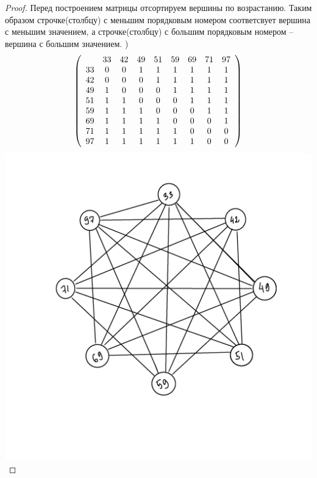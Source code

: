 \begin{proof}
Перед построением матрицы отсортируем вершины по возрастанию. Таким образом строчке(столбцу) с меньшим порядковым номером соответсвует вершина с меньшим значением, а строчке(столбцу) с большим порядковым номером -- вершина с большим значением. ) 	$$ \left( \begin{array}{c c c c c c c c c} 
   & 33 & 42 & 49 & 51 & 59 & 69 & 71 & 97 \\
 
33 & 0 & 0 & 1 & 1 & 1 & 1 & 1 & 1 \\ 

42 & 0 & 0 & 0 & 1 & 1 & 1 & 1 & 1 \\

49 & 1 & 0 & 0 & 0 & 1 & 1 & 1 & 1 \\
 
51 & 1 & 1 & 0 & 0 & 0 & 1 & 1 & 1 \\
 
59 & 1 & 1 & 1 & 0 & 0 & 0 & 1 & 1 \\
 
69 & 1 & 1 & 1 & 1 & 0 & 0 & 0 & 1 \\
 
71 & 1 & 1 & 1 & 1 & 1 & 0 & 0 & 0 \\
 
97 & 1 & 1 & 1 & 1 & 1 & 1 & 0 & 0 \end {array} \right) $$ \newline
 \includegraphics{граф1.png}
 

\end{proof}
